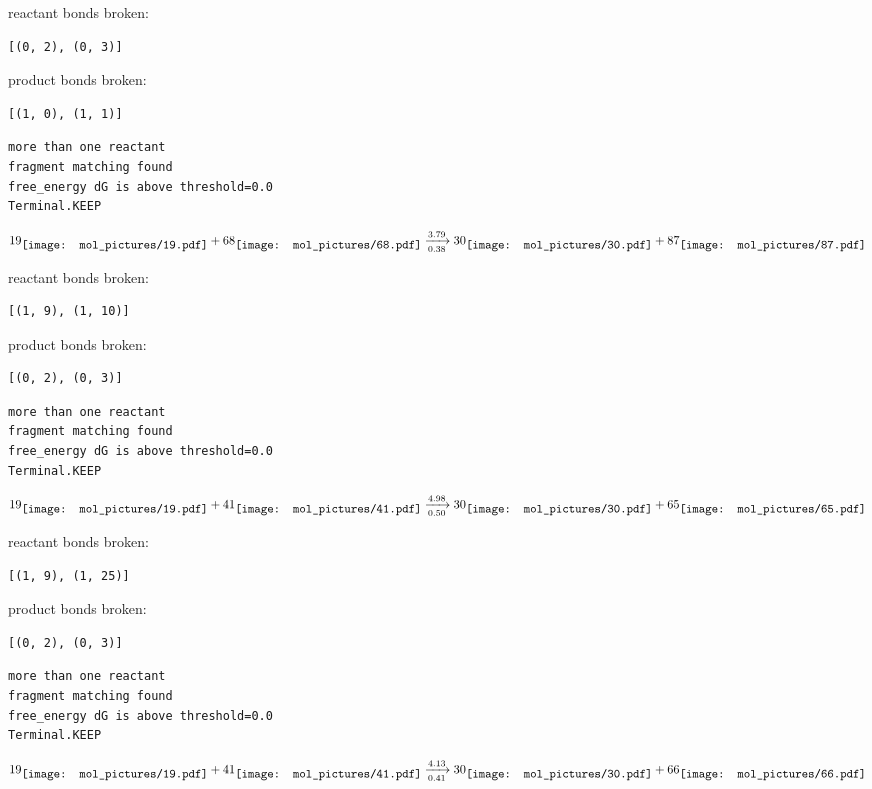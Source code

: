 \documentclass{article}
\begin{document}
reactant bonds broken:\begin{verbatim}
[(0, 2), (0, 3)]
\end{verbatim}
product bonds broken:\begin{verbatim}
[(1, 0), (1, 1)]
\end{verbatim}




\vspace{1cm}
\begin{verbatim}
more than one reactant
fragment matching found
free_energy dG is above threshold=0.0
Terminal.KEEP
\end{verbatim}
$$
19
\raisebox{-.5\height}{\texttt{[image: mol\_pictures/19.pdf]}}
+
68
\raisebox{-.5\height}{\texttt{[image: mol\_pictures/68.pdf]}}
\xrightarrow[0.38]{3.79}
30
\raisebox{-.5\height}{\texttt{[image: mol\_pictures/30.pdf]}}
+
87
\raisebox{-.5\height}{\texttt{[image: mol\_pictures/87.pdf]}}
$$


reactant bonds broken:\begin{verbatim}
[(1, 9), (1, 10)]
\end{verbatim}
product bonds broken:\begin{verbatim}
[(0, 2), (0, 3)]
\end{verbatim}




\vspace{1cm}
\begin{verbatim}
more than one reactant
fragment matching found
free_energy dG is above threshold=0.0
Terminal.KEEP
\end{verbatim}
$$
19
\raisebox{-.5\height}{\texttt{[image: mol\_pictures/19.pdf]}}
+
41
\raisebox{-.5\height}{\texttt{[image: mol\_pictures/41.pdf]}}
\xrightarrow[0.50]{4.98}
30
\raisebox{-.5\height}{\texttt{[image: mol\_pictures/30.pdf]}}
+
65
\raisebox{-.5\height}{\texttt{[image: mol\_pictures/65.pdf]}}
$$


reactant bonds broken:\begin{verbatim}
[(1, 9), (1, 25)]
\end{verbatim}
product bonds broken:\begin{verbatim}
[(0, 2), (0, 3)]
\end{verbatim}




\vspace{1cm}
\begin{verbatim}
more than one reactant
fragment matching found
free_energy dG is above threshold=0.0
Terminal.KEEP
\end{verbatim}
$$
19
\raisebox{-.5\height}{\texttt{[image: mol\_pictures/19.pdf]}}
+
41
\raisebox{-.5\height}{\texttt{[image: mol\_pictures/41.pdf]}}
\xrightarrow[0.41]{4.13}
30
\raisebox{-.5\height}{\texttt{[image: mol\_pictures/30.pdf]}}
+
66
\raisebox{-.5\height}{\texttt{[image: mol\_pictures/66.pdf]}}
$$
\end{document}
